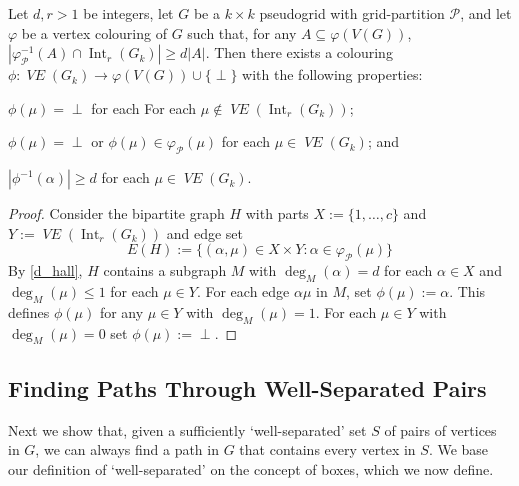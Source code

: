 \documentclass{patmorin}
\DeclareMathOperator{\interior}{Int}
\DeclareMathOperator{\VE}{\mathit{VE}}
\begin{document}
\begin{lem}\label{one_colour_per_object}
  Let $d,r>1$ be integers, let $G$ be a $k\times k$ pseudogrid with grid-partition $\mathcal{P}$, and let $\varphi$ be a vertex colouring of $G$ such that, for any $A\subseteq\varphi(V(G))$, $|\varphi_{\mathcal{P}}^{-1}(A)\cap\interior_r(G_k)| \ge d|A|$. Then there exists a colouring $\phi:\VE(G_{k})\to \varphi(V(G))\cup\{\perp\}$ with the following properties:
  \begin{compactenum}[(i)]
    \item $\phi(\mu)=\perp$ for each For each $\mu\not\in\VE(\interior_r(G_{k}))$;
    \item $\phi(\mu)=\perp$ or $\phi(\mu)\in\varphi_\mathcal{P}(\mu)$ for each $\mu\in\VE(G_{k})$; and
    \item $|\phi^{-1}(\alpha)|\ge d$ for each $\mu\in\VE(G_{k})$.
  \end{compactenum}
\end{lem}

\begin{proof}
  Consider the bipartite graph $H$ with parts $X:=\{1,\ldots,c\}$ and $Y:=\VE(\interior_r(G_k))$ and edge set
  \[
    E(H) := \{ (\alpha,\mu)\in X\times Y: \alpha\in\varphi_\mathcal{P}(\mu) \}
  \]
  By \cref{d_hall}, $H$ contains a subgraph $M$ with $\deg_M(\alpha)=d$ for each $\alpha\in X$ and $\deg_M(\mu)\le 1$ for each $\mu\in Y$.  For each edge $\alpha\mu$ in $M$, set $\phi(\mu):=\alpha$.  This defines $\phi(\mu)$ for any $\mu\in Y$ with $\deg_M(\mu)=1$.  For each $\mu\in Y$ with $\deg_M(\mu)=0$ set $\phi(\mu):=\perp$.
\end{proof}

\subsection{Finding Paths Through Well-Separated Pairs}
\label{path_finding}

Next we show that, given a sufficiently `well-separated' set $S$ of pairs of vertices in $G$, we can always find a path in $G$ that contains every vertex in $S$.
We base our definition of `well-separated' on the concept of boxes, which we now define.
\end{document}
